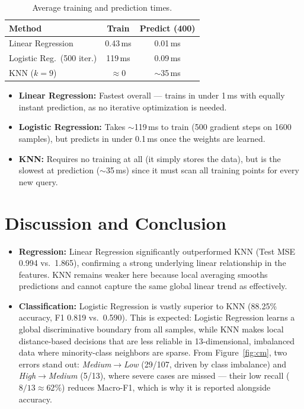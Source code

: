 \documentclass[10pt, twocolumn, letterpaper]{article}
\begin{document}
\begin{table}[H]
\centering
\caption{Average training and prediction times.}
\label{tab:runtime}
\setlength{\tabcolsep}{4pt}
\begin{tabular}{@{}lcc@{}}
\toprule
\textbf{Method} & \textbf{Train} & \textbf{Predict (400)} \\
\midrule
Linear Regression          & 0.43\,ms  & 0.01\,ms \\
Logistic Reg.\ (500 iter.) & 119\,ms   & 0.09\,ms \\
KNN ($k{=}9$)              & $\approx$0 & $\sim$35\,ms \\
\bottomrule
\end{tabular}
\end{table}

\begin{itemize}[noitemsep, leftmargin=*]
    \item \textbf{Linear Regression:} Fastest overall — trains in under 1\,ms with equally instant prediction, as no iterative optimization is needed.
    \item \textbf{Logistic Regression:} Takes $\sim$119\,ms to train (500 gradient steps on 1600 samples), but predicts in under 0.1\,ms once the weights are learned.
    \item \textbf{KNN:} Requires no training at all (it simply stores the data), but is the slowest at prediction ($\sim$35\,ms) since it must scan all training points for every new query.
\end{itemize}

\section{Discussion and Conclusion}
\begin{itemize}[leftmargin=*]
    \item \textbf{Regression:} Linear Regression significantly outperformed KNN (Test MSE 0.994 vs.\ 1.865), confirming a strong underlying linear relationship in the features. KNN remains weaker here because local averaging smooths predictions and cannot capture the same global linear trend as effectively.
    \item \textbf{Classification:} Logistic Regression is vastly superior to KNN (88.25\% accuracy, F1 0.819 vs.\ 0.590). This is expected: Logistic Regression learns a global discriminative boundary from all samples, while KNN makes local distance-based decisions that are less reliable in 13-dimensional, imbalanced data where minority-class neighbors are sparse. From Figure~\ref{fig:cm}, two errors stand out: \emph{Medium}$\to$\emph{Low} (29/107, driven by class imbalance) and \emph{High}$\to$\emph{Medium} (5/13), where severe cases are missed --- their low recall ($8/13 \approx 62\%$) reduces Macro-F1, which is why it is reported alongside accuracy.
\end{itemize}
\end{document}
